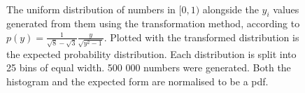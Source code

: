 \documentclass[11pt]{article}
\begin{document}
\begin{enumerate}
\begin{enumerate}
        \begin{figure}[H]%
            \centering
            \,
            \caption{The uniform distribution of numbers in $[0,1)$ alongside the $y_i$ values generated from them using the transformation method, according to $p(y)=\frac{1}{\sqrt 8 - \sqrt 3}\frac{y}{\sqrt{y^2-1}}$. Plotted with the transformed distribution is the expected probability distribution. Each distribution is split into 25 bins of equal width. 500 000 numbers were generated. Both the histogram and the expected form are normalised to be a pdf.}
            \label{fig:q2aii}
        \end{figure}


\end{enumerate}
\end{enumerate}
\end{document}
